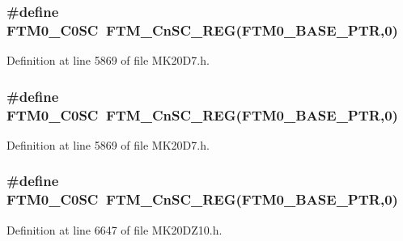\subsubsection[{\texorpdfstring{F\+T\+M0\+\_\+\+C0\+SC}{FTM0_C0SC}}]{\setlength{\rightskip}{0pt plus 5cm}\#define F\+T\+M0\+\_\+\+C0\+SC~{\bf F\+T\+M\+\_\+\+Cn\+S\+C\+\_\+\+R\+EG}({\bf F\+T\+M0\+\_\+\+B\+A\+S\+E\+\_\+\+P\+TR},0)}\hypertarget{group___f_t_m___register___accessor___macros_gaefd4cbc438ea3f1cb88052b669071fb1}{}\label{group___f_t_m___register___accessor___macros_gaefd4cbc438ea3f1cb88052b669071fb1}


Definition at line 5869 of file M\+K20\+D7.\+h.

\subsubsection[{\texorpdfstring{F\+T\+M0\+\_\+\+C0\+SC}{FTM0_C0SC}}]{\setlength{\rightskip}{0pt plus 5cm}\#define F\+T\+M0\+\_\+\+C0\+SC~{\bf F\+T\+M\+\_\+\+Cn\+S\+C\+\_\+\+R\+EG}({\bf F\+T\+M0\+\_\+\+B\+A\+S\+E\+\_\+\+P\+TR},0)}\hypertarget{group___f_t_m___register___accessor___macros_gaefd4cbc438ea3f1cb88052b669071fb1}{}\label{group___f_t_m___register___accessor___macros_gaefd4cbc438ea3f1cb88052b669071fb1}


Definition at line 5869 of file M\+K20\+D7.\+h.

\subsubsection[{\texorpdfstring{F\+T\+M0\+\_\+\+C0\+SC}{FTM0_C0SC}}]{\setlength{\rightskip}{0pt plus 5cm}\#define F\+T\+M0\+\_\+\+C0\+SC~{\bf F\+T\+M\+\_\+\+Cn\+S\+C\+\_\+\+R\+EG}({\bf F\+T\+M0\+\_\+\+B\+A\+S\+E\+\_\+\+P\+TR},0)}\hypertarget{group___f_t_m___register___accessor___macros_gaefd4cbc438ea3f1cb88052b669071fb1}{}\label{group___f_t_m___register___accessor___macros_gaefd4cbc438ea3f1cb88052b669071fb1}


Definition at line 6647 of file M\+K20\+D\+Z10.\+h.

